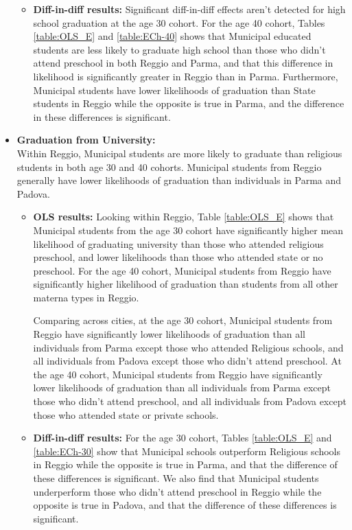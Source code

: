 \documentclass[11pt]{article}
\begin{document}
\begin{itemize}
\begin{itemize}
	\item \textbf{Diff-in-diff results:} Significant diff-in-diff effects aren't detected for high school graduation at the age 30 cohort. For the age 40 cohort, Tables \ref{table:OLS_E} and \ref{table:ECh-40} shows that
Municipal educated students are less likely to graduate high school than those who didn't attend preschool in both Reggio and Parma, and that this difference in likelihood is significantly greater in Reggio than in Parma. 
Furthermore, Municipal students have lower likelihoods of graduation than State students in Reggio while the opposite is true in Parma, and the difference in these differences is significant.
	\end{itemize}

\item \textbf{Graduation from University:} \\
Within Reggio, Municipal students are more likely to graduate than religious students in both age 30 and 40 cohorts. Municipal students from Reggio generally have lower likelihoods of graduation than individuals in Parma and Padova.
	\begin{itemize}
	\item \textbf{OLS results:}  Looking within Reggio, Table \ref{table:OLS_E} shows that Municipal students from the age 30 cohort have significantly higher mean likelihood of graduating university than those who attended religious preschool, and lower likelihoods than those who attended state or no preschool. For the age 40 cohort, Municipal students from Reggio have significantly higher likelihood of graduation than students from all other materna types in Reggio. 

	Comparing across cities, at the age 30 cohort, Municipal students from Reggio have significantly lower likelihoods of graduation than all individuals from Parma except those who attended Religious schools, and all individuals from Padova except those who didn't attend preschool. At the age 40 cohort, Municipal students from Reggio have significantly lower likelihoods of graduation than all individuals from Parma except those who didn't attend preschool, and all individuals from Padova except those who attended state or private schools. 

	\item \textbf{Diff-in-diff results:} For the age 30 cohort, Tables \ref{table:OLS_E} and \ref{table:ECh-30} show that Municipal schools outperform Religious schools in Reggio while the opposite is true in Parma, and that the difference of these differences is significant. We also find that Municipal students underperform those who didn't attend preschool in Reggio while the opposite is true in Padova, and that the difference of these differences is significant. 


\end{itemize}
\end{itemize}
\end{document}
